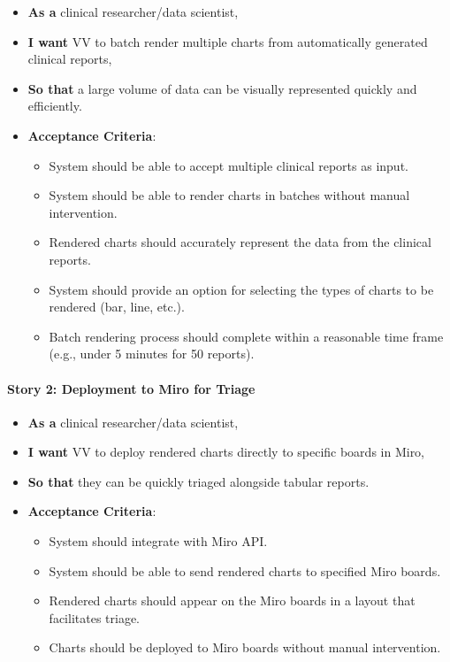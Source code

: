 \begin{itemize}
\item
  \textbf{As a} clinical researcher/data scientist,
\item
  \textbf{I want} VV to batch render multiple charts from automatically
  generated clinical reports,
\item
  \textbf{So that} a large volume of data can be visually represented
  quickly and efficiently.
\item
  \textbf{Acceptance Criteria}:

  \begin{itemize}
  \item
    System should be able to accept multiple clinical reports as input.
  \item
    System should be able to render charts in batches without manual
    intervention.
  \item
    Rendered charts should accurately represent the data from the
    clinical reports.
  \item
    System should provide an option for selecting the types of charts to
    be rendered (bar, line, etc.).
  \item
    Batch rendering process should complete within a reasonable time
    frame (e.g., under 5 minutes for 50 reports).
  \end{itemize}
\end{itemize}

\paragraph{Story 2: Deployment to Miro for
Triage}\label{story-2-deployment-to-miro-for-triage}

\begin{itemize}
\item
  \textbf{As a} clinical researcher/data scientist,
\item
  \textbf{I want} VV to deploy rendered charts directly to specific
  boards in Miro,
\item
  \textbf{So that} they can be quickly triaged alongside tabular
  reports.
\item
  \textbf{Acceptance Criteria}:

  \begin{itemize}
  \item
    System should integrate with Miro API.
  \item
    System should be able to send rendered charts to specified Miro
    boards.
  \item
    Rendered charts should appear on the Miro boards in a layout that
    facilitates triage.
  \item
    Charts should be deployed to Miro boards without manual
    intervention.
  \end{itemize}
\end{itemize}


